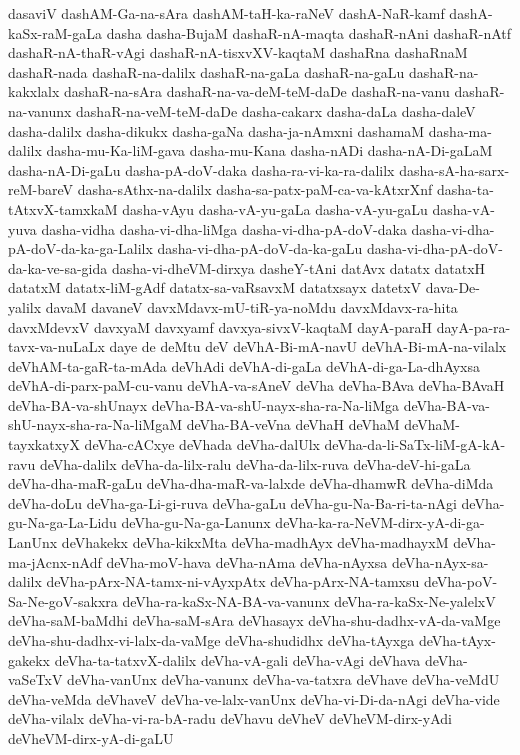 {dasaviV
dashAM-Ga-na-sAra
dashAM-taH-ka-raNeV
dashA-NaR-kamf
dashA-kaSx-raM-gaLa
dasha
dasha-BujaM
dashaR-nA-maqta
dashaR-nAni
dashaR-nAtf
dashaR-nA-thaR-vAgi
dashaR-nA-tisxvXV-kaqtaM
dashaRna
dashaRnaM
dashaR-nada
dashaR-na-dalilx
dashaR-na-gaLa
dashaR-na-gaLu
dashaR-na-kakxlalx
dashaR-na-sAra
dashaR-na-va-deM-teM-daDe
dashaR-na-vanu
dashaR-na-vanunx
dashaR-na-veM-teM-daDe
dasha-cakarx
dasha-daLa
dasha-daleV
dasha-dalilx
dasha-dikukx
dasha-gaNa
dasha-ja-nAmxni
dashamaM
dasha-ma-dalilx
dasha-mu-Ka-liM-gava
dasha-mu-Kana
dasha-nADi
dasha-nA-Di-gaLaM
dasha-nA-Di-gaLu
dasha-pA-doV-daka
dasha-ra-vi-ka-ra-dalilx
dasha-sA-ha-sarx-reM-bareV
dasha-sAthx-na-dalilx
dasha-sa-patx-paM-ca-va-kAtxrXnf
dasha-ta-tAtxvX-tamxkaM
dasha-vAyu
dasha-vA-yu-gaLa
dasha-vA-yu-gaLu
dasha-vA-yuva
dasha-vidha
dasha-vi-dha-liMga
dasha-vi-dha-pA-doV-daka
dasha-vi-dha-pA-doV-da-ka-ga-Lalilx
dasha-vi-dha-pA-doV-da-ka-gaLu
dasha-vi-dha-pA-doV-da-ka-ve-sa-gida
dasha-vi-dheVM-dirxya
dasheY-tAni
datAvx
datatx
datatxH
datatxM
datatx-liM-gAdf
datatx-sa-vaRsavxM
datatxsayx
datetxV
dava-De-yalilx
davaM
davaneV
davxMdavx-mU-tiR-ya-noMdu
davxMdavx-ra-hita
davxMdevxV
davxyaM
davxyamf
davxya-sivxV-kaqtaM
dayA-paraH
dayA-pa-ra-tavx-va-nuLaLx
daye
de
deMtu
deV
deVhA-Bi-mA-navU
deVhA-Bi-mA-na-vilalx
deVhAM-ta-gaR-ta-mAda
deVhAdi
deVhA-di-gaLa
deVhA-di-ga-La-dhAyxsa
deVhA-di-parx-paM-cu-vanu
deVhA-va-sAneV
deVha
deVha-BAva
deVha-BAvaH
deVha-BA-va-shUnayx
deVha-BA-va-shU-nayx-sha-ra-Na-liMga
deVha-BA-va-shU-nayx-sha-ra-Na-liMgaM
deVha-BA-veVna
deVhaH
deVhaM
deVhaM-tayxkatxyX
deVha-cACxye
deVhada
deVha-dalUlx
deVha-da-li-SaTx-liM-gA-kA-ravu
deVha-dalilx
deVha-da-lilx-ralu
deVha-da-lilx-ruva
deVha-deV-hi-gaLa
deVha-dha-maR-gaLu
deVha-dha-maR-va-lalxde
deVha-dhamwR
deVha-diMda
deVha-doLu
deVha-ga-Li-gi-ruva
deVha-gaLu
deVha-gu-Na-Ba-ri-ta-nAgi
deVha-gu-Na-ga-La-Lidu
deVha-gu-Na-ga-Lanunx
deVha-ka-ra-NeVM-dirx-yA-di-ga-LanUnx
deVhakekx
deVha-kikxMta
deVha-madhAyx
deVha-madhayxM
deVha-ma-jAcnx-nAdf
deVha-moV-hava
deVha-nAma
deVha-nAyxsa
deVha-nAyx-sa-dalilx
deVha-pArx-NA-tamx-ni-vAyxpAtx
deVha-pArx-NA-tamxsu
deVha-poV-Sa-Ne-goV-sakxra
deVha-ra-kaSx-NA-BA-va-vanunx
deVha-ra-kaSx-Ne-yalelxV
deVha-saM-baMdhi
deVha-saM-sAra
deVhasayx
deVha-shu-dadhx-vA-da-vaMge
deVha-shu-dadhx-vi-lalx-da-vaMge
deVha-shudidhx
deVha-tAyxga
deVha-tAyx-gakekx
deVha-ta-tatxvX-dalilx
deVha-vA-gali
deVha-vAgi
deVhava
deVha-vaSeTxV
deVha-vanUnx
deVha-vanunx
deVha-va-tatxra
deVhave
deVha-veMdU
deVha-veMda
deVhaveV
deVha-ve-lalx-vanUnx
deVha-vi-Di-da-nAgi
deVha-vide
deVha-vilalx
deVha-vi-ra-bA-radu
deVhavu
deVheV
deVheVM-dirx-yAdi
deVheVM-dirx-yA-di-gaLU
}
